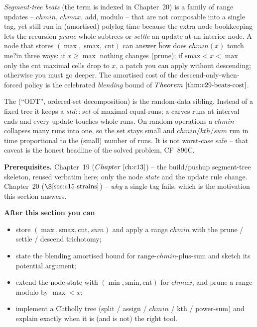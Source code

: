 \begin{topicintro}
\emph{Segment-tree beats} (the term is indexed in Chapter~20) is a family of
range updates -- \(\mathit{chmin}\), \(\mathit{chmax}\), add, modulo -- that are
not composable into a single tag, yet still run in (amortised) polylog time
because the extra node bookkeeping lets the recursion \emph{prune} whole subtrees
or \emph{settle} an update at an interior node.  A node that stores
\((\max,\;\mathrm{smax},\;\mathrm{cnt})\) can answer \"how does \(\mathit{chmin}(x)\)
touch me?\" in three ways: if \(x\ge\max\) nothing changes (prune); if
\(\mathrm{smax}<x<\max\) only the \(\mathrm{cnt}\) maximal cells drop to \(x\), a
patch you can apply without descending; otherwise you must go deeper.  The
amortised cost of the descend-only-when-forced policy is the celebrated
\emph{blending} bound of \(\thmref{c29-beats-cost}\).

The  (``ODT'', ordered-set decomposition) is the
random-data sibling.  Instead of a fixed tree it keeps a \(\mathit{std::set}\) of
maximal equal-runs; a  carves runs at interval ends and every update
touches whole runs.  On random operations a \(\mathit{chmin}\) collapses many runs
into one, so the set stays small and \(\mathit{chmin}/\mathit{kth}/\mathit{sum}\)
run in time proportional to the (small) number of runs.  It is not worst-case
safe -- that caveat is the honest headline of the solved problem, CF~896C.

\textbf{Prerequisites.} Chapter~19 (\(\chref{c13}\)) -- the build/pushup segment-tree
skeleton, reused verbatim here; only the node \emph{state} and the update rule
change.  Chapter~20 (\(\secref{c15-strains}\)) -- \emph{why} a single tag fails,
which is the motivation this section answers.

\textbf{After this section you can}
\begin{itemize}[nosep]
  \item store \((\max,\mathrm{smax},\mathrm{cnt},\mathit{sum})\) and apply a range
        \(\mathit{chmin}\) with the prune / settle / descend trichotomy; \hfill{}
  \item state the blending amortised bound for range-\(\mathit{chmin}\)-plus-sum and
        sketch its potential argument; \hfill{}
  \item extend the node state with \((\min,\mathrm{smin},\mathrm{cnt})\) for
        \(\mathit{chmax}\), and prune a range modulo by \(\max<x\); \hfill{}
  \item implement a Chtholly tree (split / assign / \(\mathit{chmin}\) / kth /
        power-sum) and explain exactly when it is (and is not) the right tool. \hfill{}
\end{itemize}
\end{topicintro}

